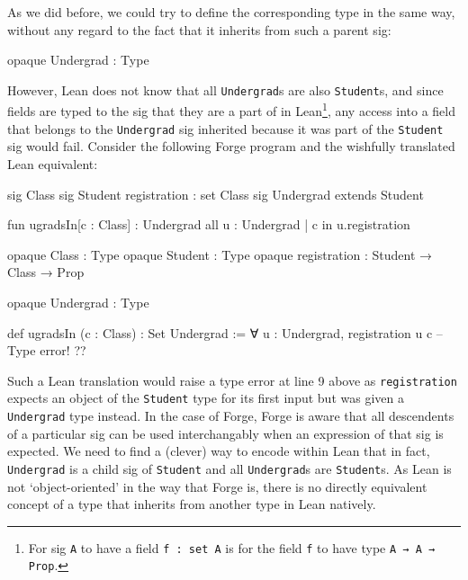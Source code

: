 As we did before, we could try to define the corresponding type in the same way, without any regard to the fact that it inherits from such a parent sig: 
\begin{lean*}
opaque Undergrad : Type
\end{lean*}
However, Lean does not know that all \texttt{Undergrad}s are also \texttt{Student}s, and since fields are typed to the sig that they are a part of in Lean\footnote{For sig \texttt{A} to have a field \texttt{f : set A} is for the field \texttt{f} to have type \texttt{A → A → Prop}.}, any access into a field that belongs to the \texttt{Undergrad} sig inherited because it was part of the \texttt{Student} sig would fail. Consider the following Forge program and the wishfully translated Lean equivalent:

\vspace{0.5em}
\noindent\begin{minipage}{0.5\textwidth}
\begin{forge}
sig Class {}
sig Student {
  registration : set Class
}
sig Undergrad extends Student {}

fun ugradsIn[c : Class] : Undergrad {
  all u : Undergrad |
    c in u.registration
}
\end{forge}
\end{minipage}%
\begin{minipage}{0.5\textwidth}
\begin{lean*}
opaque Class : Type
opaque Student : Type
opaque registration : Student → Class → Prop

opaque Undergrad : Type

def ugradsIn (c : Class) : Set Undergrad :=
  ∀ u : Undergrad, 
    registration u c -- Type error!
?\phantom{}?
\end{lean*}
\end{minipage}
\vspace{0.5em}

Such a Lean translation would raise a type error at line 9 above as \texttt{registration} expects an object of the \texttt{Student} type for its first input but was given a \texttt{Undergrad} type instead. In the case of Forge, Forge is aware that all descendents of a particular sig can be used interchangably when an expression of that sig is expected. We need to find a (clever) way to encode within Lean that in fact, \texttt{Undergrad} is a child sig of \texttt{Student} and all \texttt{Undergrad}s are \texttt{Student}s. As Lean is not `object-oriented' in the way that Forge is, there is no directly equivalent concept of a type that inherits from another type in Lean natively. 

